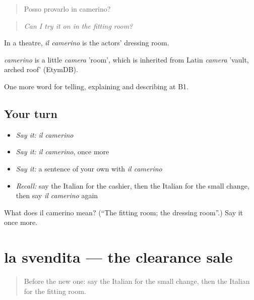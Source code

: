 \begin{quote}
Posso provarlo in camerino?
\end{quote}

\begin{quote}
\emph{Can I try it on in the fitting room?}
\end{quote}

In a theatre, \emph{il camerino} is the actors' dressing room.

\begin{cousinweb}
\emph{camerino} is a little \emph{camera} 'room', which is inherited from Latin \emph{camera} 'vault, arched roof' (EtymDB).
\end{cousinweb}

\begin{grammarlens}[title={What you've built}]
One more word for telling, explaining and describing at B1.
\end{grammarlens}

\subsection*{Your turn}
\begin{itemize}
\raggedright
  \item \emph{Say it:} \emph{il camerino}
  \item \emph{Say it:} \emph{il camerino}, once more
  \item \emph{Say it:} a sentence of your own with \emph{il camerino}
  \item \emph{Recall:} say the Italian for the cashier, then the Italian for the small change, then say \emph{il camerino} again
\end{itemize}

\begin{tcolorbox}[breakable,colback=teal!4,colframe=teal!35!black,title={Before you move on}]
What does il camerino mean? (\textquotedblleft{}The fitting room; the dressing room\textquotedblright{}.) Say it once more.
\end{tcolorbox}
\section[la svendita]{la svendita — the clearance sale}

\label{lesson:IT-C457-svendita}



\begin{quote}
Before the new one: say the Italian for the small change, then the Italian for the fitting room.
\end{quote}

